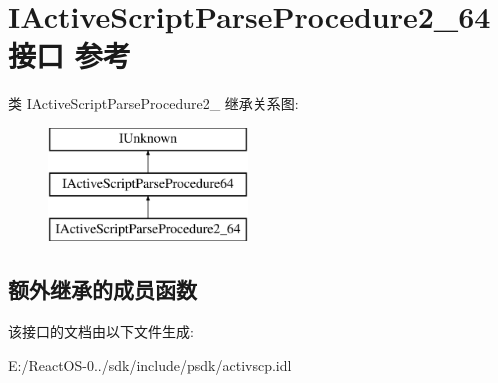 \hypertarget{interface_i_active_script_parse_procedure2__64}{}\section{I\+Active\+Script\+Parse\+Procedure2\+\_\+64接口 参考}
\label{interface_i_active_script_parse_procedure2__64}
类 I\+Active\+Script\+Parse\+Procedure2\+\_ 继承关系图\+:\begin{figure}[H]
\begin{center}
\leavevmode
\includegraphics[height=3.000000cm]{interface_i_active_script_parse_procedure2__64}
\end{center}
\end{figure}
\subsection*{额外继承的成员函数}


该接口的文档由以下文件生成\+:\begin{DoxyCompactItemize}
\item 
E\+:/\+React\+O\+S-\/0../sdk/include/psdk/activscp.\+idl\end{DoxyCompactItemize}

